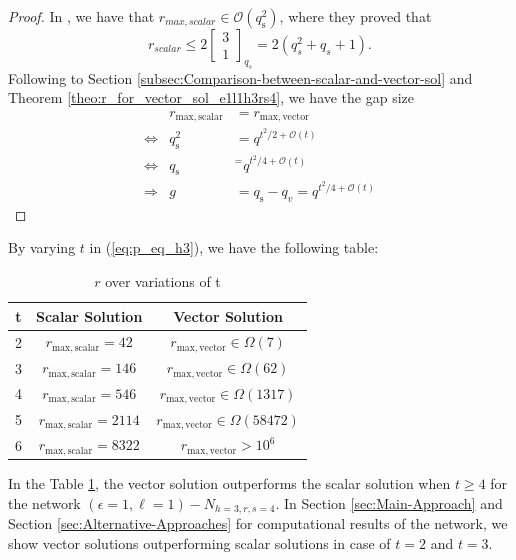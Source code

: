 \begin{proof}
In \cite[Sec. VIII-C]{Wachter-Zeh:2018}, we have that $r_{max,scalar}\in\mathcal{O}\left(q_{\mathrm{s}}^{2}\right)$,
where they proved that
\begin{equation}
r_{scalar}\leq2\left[\begin{array}{c}
3\\
1
\end{array}\right]_{q_{s}}=2\left(q_{s}^{2}+q_{s}+1\right).\label{eq:r_scalar_max}
\end{equation}
Following to Section \ref{subsec:Comparison-between-scalar-and-vector-sol}
and Theorem \ref{theo:r_for_vector_sol_e1l1h3rs4}, we have the gap
size
\begin{eqnarray}
 & r_{\mathrm{max,scalar}} & =r_{\mathrm{max,vector}}\nonumber \\
\Leftrightarrow & q_{\mathrm{s}}^{2} & =q^{t^{2}/2+\mathcal{O}(t)}\nonumber \\
\Leftrightarrow & q_{\mathrm{s}} & ^{=}q^{t^{2}/4+\mathcal{O}(t)}\nonumber \\
\Rightarrow & g & =q_{\mathrm{s}}-q_{v}=q^{t^{2}/4+\mathcal{O}(t)}\label{eq:gap_e1l1h3rs4}
\end{eqnarray}
\end{proof}
By varying $t$ in (\ref{eq:p_eq_h3}), we have the following table:
\begin{table}[H]
\begin{centering}
\caption{$r$ over variations of t\label{tab:r_over_t}}
\par\end{centering}
\centering{}%
\begin{tabular}{|c|c|c|}
\hline 
t & Scalar Solution & Vector Solution\tabularnewline
\hline 
\hline 
2 & $r_{\mathrm{max,scalar}}=42$ & $r_{\mathrm{max,vector}}\in\Omega\left(7\right)$\tabularnewline
\hline 
3 & $r_{\mathrm{max,scalar}}=146$ & $r_{\mathrm{max,vector}}\in\Omega\left(62\right)$ \tabularnewline
\hline 
4 & $r_{\mathrm{max,scalar}}=546$ & $r_{\mathrm{max,vector}}\in\Omega\left(1317\right)$\tabularnewline
\hline 
5 & $r_{\mathrm{max,scalar}}=2114$ & $r_{\mathrm{max,vector}}\in\Omega\left(58472\right)$\tabularnewline
\hline 
6 & $r_{\mathrm{max,scalar}}=8322$ & $r_{\mathrm{max,vector}}>10^{6}$\tabularnewline
\hline 
\end{tabular}
\end{table}
In the Table \ref{tab:r_over_t}, the vector solution outperforms
the scalar solution when $t\geq4$ for the network $\left(\epsilon=1,\ell=1\right)-\ensuremath{N}_{h=3,r,s=4}$.
In Section \ref{sec:Main-Approach} and Section \ref{sec:Alternative-Approaches}
for computational results of the network, we show vector solutions
outperforming scalar solutions in case of $t=2$ and $t=3$.

